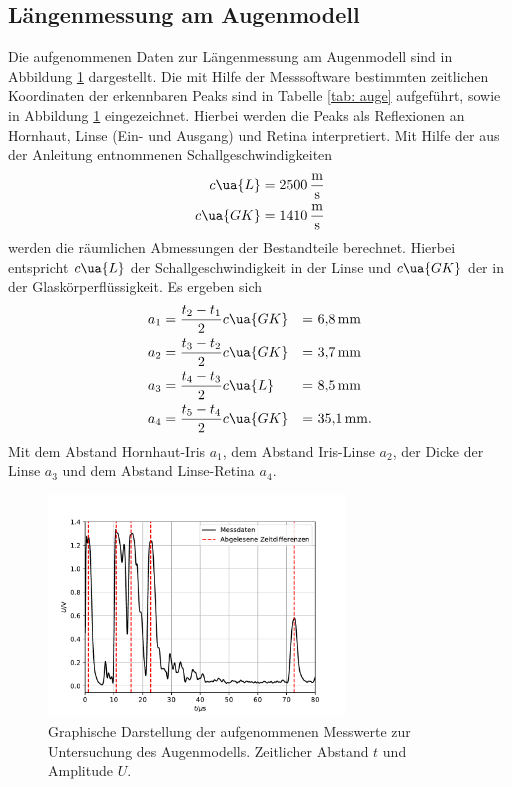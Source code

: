 \subsection{Längenmessung am Augenmodell}
Die aufgenommenen Daten zur Längenmessung am Augenmodell sind in Abbildung \ref{fig: auge} dargestellt. Die mit Hilfe
der Messsoftware bestimmten zeitlichen Koordinaten der erkennbaren Peaks sind in Tabelle \ref{tab: auge} aufgeführt, sowie in Abbildung
\ref{fig: auge} eingezeichnet. Hierbei werden die Peaks als Reflexionen an Hornhaut, Linse (Ein- und Ausgang) und Retina interpretiert. %
Mit Hilfe der aus der Anleitung \cite{anleitungus1} entnommenen Schallgeschwindigkeiten
\begin{align}
  \begin{aligned}
    c\ua{L} &= \SI{2500}{\meter\per\second}\\
    c\ua{GK}&= \SI{1410}{\meter\per\second}
  \end{aligned}
\end{align}
werden die räumlichen Abmessungen der Bestandteile berechnet. Hierbei entspricht $c\ua{L}$ der Schallgeschwindigkeit
in der Linse und $c\ua{GK}$ der in der Glaskörperflüssigkeit. Es ergeben sich
\begin{align}
  \begin{aligned}
a_1 &= \frac{t_2 - t_1}{2} c\ua{GK} &=&\,\, \SI[]{6.8}{\milli\meter} \\
a_2 &= \frac{t_3 - t_2}{2} c\ua{GK} &=&\,\, \SI[]{3.7}{\milli\meter}\\
a_3 &= \frac{t_4 - t_3}{2} c\ua{L}  &=&\,\, \SI[]{8.5}{\milli\meter}\\
a_4 &= \frac{t_5 - t_4}{2} c\ua{GK} &=&\,\,\SI[]{35.1}{\milli\meter}.
\end{aligned}
\end{align} 
Mit dem Abstand Hornhaut-Iris $a_1$, dem Abstand Iris-Linse $a_2$,
der Dicke der Linse $a_3$ und dem Abstand Linse-Retina $a_4$.

\begin{figure}[H]
  \centering
  \includegraphics[width = 0.7\textwidth]{../Messdaten/plots/auge.pdf}
  \caption{Graphische Darstellung der aufgenommenen Messwerte zur Untersuchung des Augenmodells. Zeitlicher Abstand $t$ und Amplitude $U$.}
  \label{fig: auge}
\end{figure}
